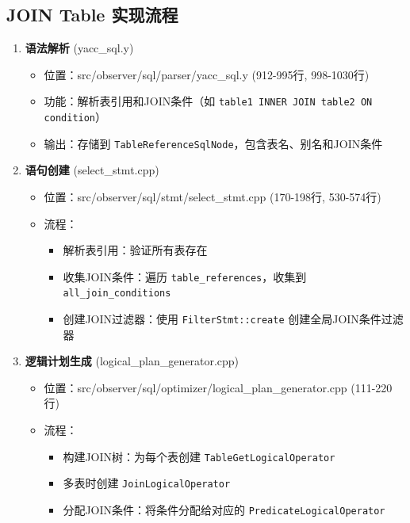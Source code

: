 \documentclass[a4paper, 12pt]{article}
\begin{document}
\subsection{JOIN Table 实现流程}
\begin{enumerate}
    \item \textbf{语法解析} (yacc\_sql.y)
    \begin{itemize}
        \item 位置：src/observer/sql/parser/yacc\_sql.y (912-995行, 998-1030行)
        \item 功能：解析表引用和JOIN条件（如 \texttt{table1 INNER JOIN table2 ON condition}）
        \item 输出：存储到 \texttt{TableReferenceSqlNode}，包含表名、别名和JOIN条件
    \end{itemize}
    
    \item \textbf{语句创建} (select\_stmt.cpp)
    
\begin{itemize}
        \item 位置：src/observer/sql/stmt/select\_stmt.cpp (170-198行, 530-574行)
        \item 流程：
        \begin{itemize}
            \item 解析表引用：验证所有表存在
            \item 收集JOIN条件：遍历 \texttt{table\_references}，收集到 \texttt{all\_join\_conditions}
            \item 创建JOIN过滤器：使用 \texttt{FilterStmt::create} 创建全局JOIN条件过滤器
        \end{itemize}
    \end{itemize}
    
    \item \textbf{逻辑计划生成} (logical\_plan\_generator.cpp)
    
\begin{itemize}
        \item 位置：src/observer/sql/optimizer/logical\_plan\_generator.cpp (111-220行)
        \item 流程：
        \begin{itemize}
            \item 构建JOIN树：为每个表创建 \texttt{TableGetLogicalOperator}
            \item 多表时创建 \texttt{JoinLogicalOperator}
            \item 分配JOIN条件：将条件分配给对应的 \texttt{PredicateLogicalOperator}
        \end{itemize}
    \end{itemize}
    

\end{enumerate}
\end{document}
